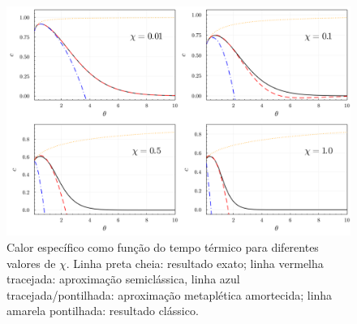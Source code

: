 \documentclass[
	12pt,
	oneside,			%
	a4paper,			%
	english,			%
	brazil				%
	]{abntex2}
\theoremstyle{definition}
\begin{document}
\begin{figure}[H]
    \includegraphics[width=\textwidth]{Imagens/calores_especificos_kerr.png}
    \centering
    \caption{Calor específico como função do tempo térmico para diferentes valores de $\chi$. Linha preta cheia: resultado exato; linha vermelha tracejada: aproximação semiclássica, linha azul tracejada/pontilhada: aproximação metaplética amortecida; linha amarela pontilhada: resultado clássico.}
    \label{calores específicos kerr}
\end{figure}
\end{document}
